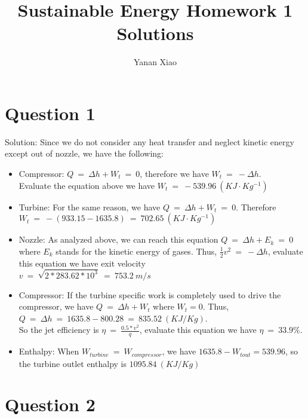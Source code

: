 \documentclass[12pt]{article}
\begin{document}
\title{Sustainable Energy Homework 1 Solutions}
\author{Yanan Xiao}
\maketitle{}

\section{Question 1}
\label{sec:question-1}

Solution: Since we do not consider any heat transfer and neglect
kinetic energy except out of nozzle, we have the following:

\begin{itemize}
\item Compressor: $Q~=~\Delta h + W_{t}~=~ 0$, therefore we have $W_{t}~ =~
  -\Delta h$.\\
  Evaluate the equation above we have $W_{t}~=~-539.96~(KJ\cdot
  Kg^{-1})$
\item Turbine: For the same reason, we have $Q~=~\Delta h +
  W_{t}~=~ 0$. Therefore $W_{t}~=~ -(933.15 - 1635.8)~=~
  702.65~(KJ\cdot Kg^{-1})$
\item Nozzle: As analyzed above, we can reach this equation
  $Q~=~\Delta h + E_{k}~=~ 0$ where $E_{k}$ stands for the kinetic
  energy of gases. Thus, $\frac{1}{2}v^{2}~=~ -\Delta h$, evaluate
  this equation we have exit velocity\\ $v~=~\sqrt{2*283.62*10^{3}}~=~
  753.2~m/s$
\item Compressor: If the turbine specific work is completely used to
  drive the compressor, we have $Q~=~\Delta h + W_{t}$ where
  $W_{t}=0$. Thus, $Q~=~\Delta h~=~ 1635.8 -
  800.28~=~835.52~(KJ/Kg)$.\\
  So the jet efficiency is $\eta~=~\frac{0.5*v^{2}}{q}$, evaluate this
  equation we have $\eta~=~33.9\%$.
\item Enthalpy: When $W_{turbine}~=~W_{compressor}$, we have
  $1635.8-W_{tout}=539.96$, so the turbine outlet enthalpy is
  $1095.84~(KJ/Kg)$ 
\end{itemize}

\section{Question 2}
\label{sec:question-2}
\end{document}
